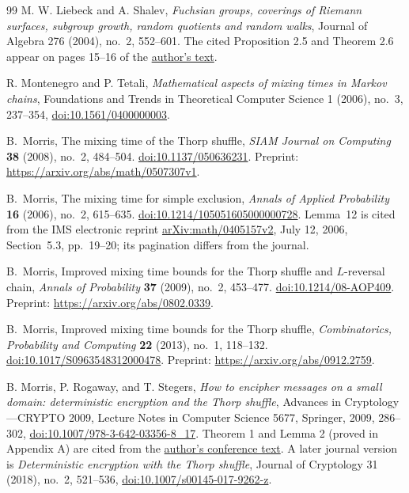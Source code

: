 \begin{thebibliography}{99}
M. W. Liebeck and A. Shalev,
\emph{Fuchsian groups, coverings of Riemann surfaces, subgroup growth,
random quotients and random walks},
Journal of Algebra 276 (2004), no.~2, 552--601.
The cited Proposition 2.5 and Theorem 2.6 appear on pages 15--16
of the \href{https://www.ma.ic.ac.uk/~mwl/fuchs.pdf}{author's text}.

R. Montenegro and P. Tetali,
\emph{Mathematical aspects of mixing times in Markov chains},
Foundations and Trends in Theoretical Computer Science 1 (2006), no.~3,
237--354, \href{https://doi.org/10.1561/0400000003}{doi:10.1561/0400000003}.

B.~Morris,
The mixing time of the Thorp shuffle,
\emph{SIAM Journal on Computing} \textbf{38} (2008), no.~2, 484--504.
\href{https://doi.org/10.1137/050636231}{doi:10.1137/050636231}.
Preprint: \url{https://arxiv.org/abs/math/0507307v1}.

B.~Morris,
The mixing time for simple exclusion,
\emph{Annals of Applied Probability} \textbf{16} (2006), no.~2,
615--635.
\href{https://doi.org/10.1214/105051605000000728}
{doi:10.1214/105051605000000728}.
Lemma~12 is cited from the IMS electronic reprint
\href{https://arxiv.org/abs/math/0405157v2}{arXiv:math/0405157v2},
July 12, 2006, Section~5.3, pp.~19--20; its pagination differs
from the journal.

B.~Morris,
Improved mixing time bounds for the Thorp shuffle and $L$-reversal chain,
\emph{Annals of Probability} \textbf{37} (2009), no.~2, 453--477.
\href{https://doi.org/10.1214/08-AOP409}{doi:10.1214/08-AOP409}.
Preprint: \url{https://arxiv.org/abs/0802.0339}.

B.~Morris,
Improved mixing time bounds for the Thorp shuffle,
\emph{Combinatorics, Probability and Computing} \textbf{22} (2013),
no.~1, 118--132.
\href{https://doi.org/10.1017/S0963548312000478}
{doi:10.1017/S0963548312000478}.
Preprint: \url{https://arxiv.org/abs/0912.2759}.

B. Morris, P. Rogaway, and T. Stegers,
\emph{How to encipher messages on a small domain:
deterministic encryption and the Thorp shuffle},
Advances in Cryptology---CRYPTO 2009,
Lecture Notes in Computer Science 5677, Springer, 2009, 286--302,
\href{https://doi.org/10.1007/978-3-642-03356-8_17}{doi:10.1007/978-3-642-03356-8\_17}.
Theorem 1 and Lemma 2 (proved in Appendix A) are cited from the
\href{https://www.cs.ucdavis.edu/~rogaway/papers/thorp.pdf}{author's conference text}.
A later journal version is \emph{Deterministic encryption with the Thorp shuffle},
Journal of Cryptology 31 (2018), no.~2, 521--536,
\href{https://doi.org/10.1007/s00145-017-9262-z}{doi:10.1007/s00145-017-9262-z}.


\end{thebibliography}
